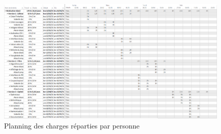 		\begin{landscape}
		 	\begin{figure}
	            \centering
	            \includegraphics[height=0.70\textwidth]{figure/RepartitionTaches2.png}
	            \caption{Planning des charges réparties par personne}
	            \label{fig:planning_charge}
	        \end{figure}
	    \end{landscape}